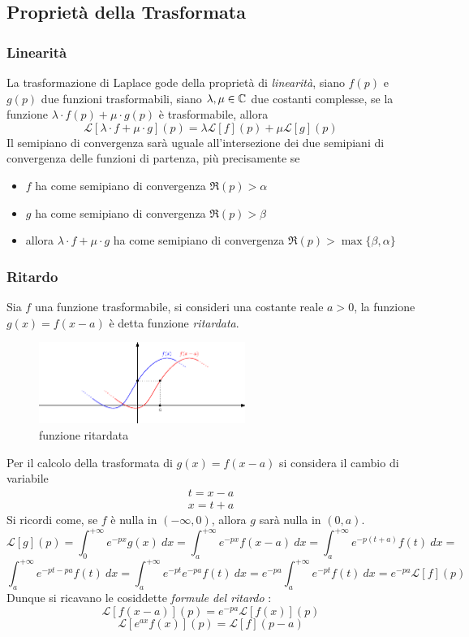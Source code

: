 \documentclass[10pt, letterpaper]{report}
\begin{document}
\subsection{Proprietà della Trasformata}
\subsubsection{Linearità}
La trasformazione di Laplace gode della proprietà di \textit{linearità}, siano $f(p)$ e $g(p)$ due funzioni 
trasformabili, siano $\lambda,\mu \in {\mathbb C}$ due costanti complesse, se la funzione 
$\lambda \cdot f(p)+\mu \cdot g(p)$ è trasformabile, allora 
$$ 
\mathcal{L}[\lambda \cdot f+\mu \cdot g](p)=\lambda\mathcal{L}[f](p)+\mu\mathcal{L}[g](p)
$$
Il semipiano di convergenza sarà uguale all'intersezione dei due semipiani di convergenza delle funzioni 
di partenza, più precisamente se \begin{itemize}
    \item $f$ ha come semipiano di convergenza $\Re(p)>\alpha$
    \item $g$ ha come semipiano di convergenza $\Re(p)>\beta$
    \item allora $\lambda \cdot f+\mu \cdot g$ ha come semipiano di convergenza $\Re(p)>\max\{\beta,\alpha\}$
\end{itemize}
\subsubsection{Ritardo}
Sia $f$ una funzione trasformabile, si consideri una costante reale $a>0$, la funzione $g(x)=f(x-a)$ è detta 
funzione \textit{ritardata}.\begin{center}
\begin{figure}[h!]\centering
    \includegraphics[width=0.6\textwidth ]{images/funRit.eps}
    \caption{funzione ritardata}
 \end{figure}\end{center}
Per il calcolo della trasformata di $g(x)=f(x-a)$ si considera il cambio di variabile $$\begin{matrix}
    t=x-a\\ x=t+a
\end{matrix} $$
Si ricordi come, se $f$ è nulla in $(-\infty,0)$, allora $g$ sarà nulla in $(0,a)$.
$$ 
\mathcal{L}[g](p)=\int_0^{+\infty}e^{-px}g(x)\ dx =\int_a^{+\infty}e^{-px}f(x-a)\ dx  =
\int_a^{+\infty}e^{-p(t+a)}f(t)\ dx = 
$$ 
$$ 
\int_a^{+\infty}e^{-pt-pa}f(t)\ dx 
= \int_a^{+\infty}e^{-pt}e^{-pa}f(t)\ dx = e^{-pa}\int_a^{+\infty}e^{-pt}f(t)\ dx = 
e^{-pa}\mathcal{L}[f](p)$$
Dunque si ricavano le cosiddette \textit{formule del ritardo} : 
$$ 
\mathcal{L}[f(x-a)](p)=e^{-pa}\mathcal{L}[f(x)](p)
$$ $$ 
\mathcal{L}[e^{ax}f(x)](p)=\mathcal{L}[f](p-a)
$$
\end{document}
